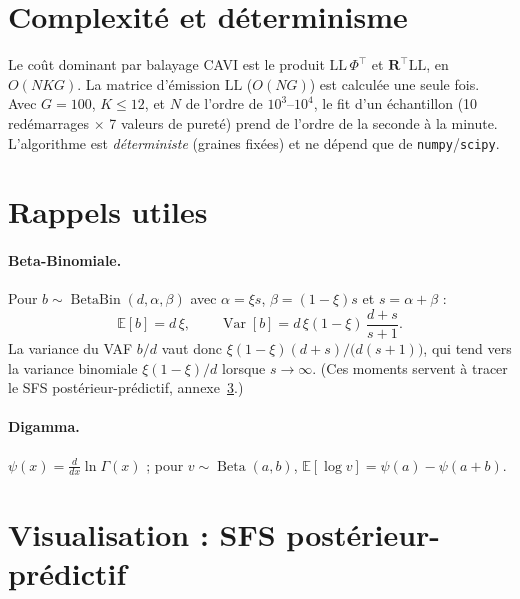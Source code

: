 \documentclass[11pt,a4paper]{article}
\DeclareMathOperator{\BetaBin}{BetaBin}
\DeclareMathOperator{\Bdist}{Beta}
\newcommand{\E}{\mathbb{E}}
\newcommand{\code}[1]{\texttt{#1}}
\newcommand{\Rmat}{\mathbf{R}}
\theoremstyle{remark}
\begin{document}
\section{Complexité et déterminisme}

Le coût dominant par balayage CAVI est le produit $\mathrm{LL}\,\Phi^{\!\top}$ et
$\Rmat^{\!\top}\mathrm{LL}$, en $O(NKG)$. La matrice d'émission $\mathrm{LL}$ ($O(NG)$) est
calculée une seule fois. Avec $G=100$, $K\le 12$, et $N$ de l'ordre de $10^3$--$10^4$, le fit
d'un échantillon (10 redémarrages $\times$ 7 valeurs de pureté) prend de l'ordre de la
seconde à la minute. L'algorithme est \emph{déterministe} (graines fixées) et ne dépend que
de \code{numpy}/\code{scipy}.

\appendix
\section{Rappels utiles}

\paragraph{Beta-Binomiale.} Pour $b\sim\BetaBin(d,\alpha,\beta)$ avec $\alpha=\xi s$,
$\beta=(1-\xi)s$ et $s=\alpha+\beta$ :
\[
\E[b]=d\,\xi,\qquad \operatorname{Var}[b]=d\,\xi(1-\xi)\,\frac{d+s}{s+1}.
\]
La variance du VAF $b/d$ vaut donc $\xi(1-\xi)(d+s)/\big(d(s+1)\big)$, qui tend vers la
variance binomiale $\xi(1-\xi)/d$ lorsque $s\to\infty$. (Ces moments servent à tracer le SFS
postérieur-prédictif, annexe~\ref{app:sfs}.)

\paragraph{Digamma.} $\psi(x)=\frac{d}{dx}\ln\Gamma(x)$ ; pour
$v\sim\Bdist(a,b)$, $\E[\log v]=\psi(a)-\psi(a+b)$.

\section{Visualisation : SFS postérieur-prédictif}\label{app:sfs}
\end{document}
